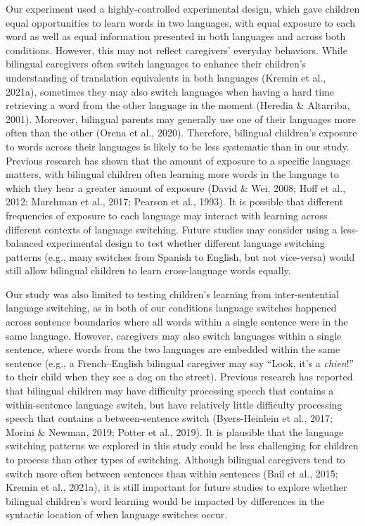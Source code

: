 \documentclass[
  man,floatsintext]{apa7}
\begin{document}
Our experiment used a highly-controlled experimental design, which gave children equal opportunities to learn words in two languages, with equal exposure to each word as well as equal information presented in both languages and across both conditions. However, this may not reflect caregivers' everyday behaviors. While bilingual caregivers often switch languages to enhance their children's understanding of translation equivalents in both languages (Kremin et al., 2021a), sometimes they may also switch languages when having a hard time retrieving a word from the other language in the moment (Heredia \& Altarriba, 2001). Moreover, bilingual parents may generally use one of their languages more often than the other (Orena et al., 2020). Therefore, bilingual children's exposure to words across their languages is likely to be less systematic than in our study. Previous research has shown that the amount of exposure to a specific language matters, with bilingual children often learning more words in the language to which they hear a greater amount of exposure (David \& Wei, 2008; Hoff et al., 2012; Marchman et al., 2017; Pearson et al., 1993). It is possible that different frequencies of exposure to each language may interact with learning across different contexts of language switching. Future studies may consider using a less-balanced experimental design to test whether different language switching patterns (e.g., many switches from Spanish to English, but not vice-versa) would still allow bilingual children to learn cross-language words equally.

Our study was also limited to testing children's learning from inter-sentential language switching, as in both of our conditions language switches happened across sentence boundaries where all words within a single sentence were in the same language. However, caregivers may also switch languages within a single sentence, where words from the two languages are embedded within the same sentence (e.g., a French--English bilingual caregiver may say ``Look, it's a \emph{chien}!'' to their child when they see a dog on the street). Previous research has reported that bilingual children may have difficulty processing speech that contains a within-sentence language switch, but have relatively little difficulty processing speech that contains a between-sentence switch (Byers-Heinlein et al., 2017; Morini \& Newman, 2019; Potter et al., 2019). It is plausible that the language switching patterns we explored in this study could be less challenging for children to process than other types of switching. Although bilingual caregivers tend to switch more often between sentences than within sentences (Bail et al., 2015; Kremin et al., 2021a), it is still important for future studies to explore whether bilingual children's word learning would be impacted by differences in the syntactic location of when language switches occur.
\end{document}
